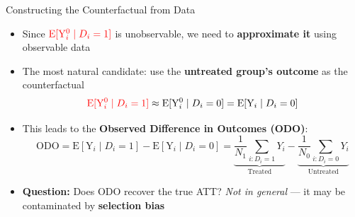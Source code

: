 \documentclass[hyperref={pdfpagelabels=false}]{beamer}
\begin{document}
\begin{frame}{Constructing the Counterfactual from Data}
	\begin{itemize}
		\item Since ${\color{red}\mathrm{E}[\mathrm{Y}^{0}_{i} \mid D_i=1]}$ is unobservable, we need to \textbf{approximate it} using observable data
		\vspace{0.3cm}
		\item The most natural candidate: use the \textbf{untreated group's outcome} as the counterfactual
		\begin{equation*}
			{\color{red}\mathrm{E}[\mathrm{Y}^{0}_{i} \mid D_i=1]} \approx \mathrm{E}[\mathrm{Y}^{0}_{i} \mid D_i=0] = \mathrm{E}[\mathrm{Y}_{i} \mid D_i=0]
		\end{equation*}
		\vspace{0.1cm}
		\item This leads to the \textbf{Observed Difference in Outcomes (ODO)}:
		\begin{equation*}
			\text{ODO} = \mathrm{E}[\mathrm{Y}_{i} \mid D_i=1] - \mathrm{E}[\mathrm{Y}_{i} \mid D_i=0]
			= \underbrace{\dfrac{1}{N_1} \sum_{i:D_i=1} Y_i}_{\text{Treated}} - \underbrace{\dfrac{1}{N_0} \sum_{i:D_i=0} Y_i}_{\text{Untreated}}
		\end{equation*}
		\vspace{0.1cm}
		\item \textbf{Question:} Does ODO recover the true ATT? \emph{Not in general} --- it may be contaminated by \textbf{selection bias}
	\end{itemize}
\end{frame}
\end{document}
